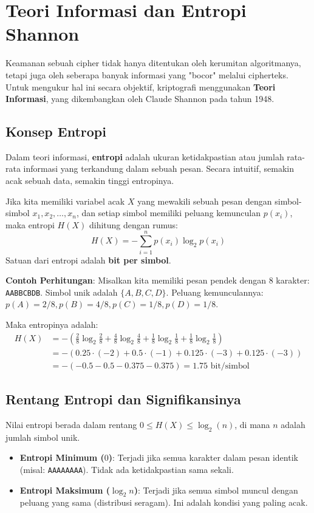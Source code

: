 \section{Teori Informasi dan Entropi Shannon}

Keamanan sebuah cipher tidak hanya ditentukan oleh kerumitan algoritmanya, tetapi juga oleh seberapa banyak informasi yang "bocor" melalui cipherteks. Untuk mengukur hal ini secara objektif, kriptografi menggunakan \textbf{Teori Informasi}, yang dikembangkan oleh Claude Shannon pada tahun 1948.

\subsection{Konsep Entropi}

Dalam teori informasi, \textbf{entropi} adalah ukuran ketidakpastian atau jumlah rata-rata informasi yang terkandung dalam sebuah pesan. Secara intuitif, semakin acak sebuah data, semakin tinggi entropinya.

Jika kita memiliki variabel acak $X$ yang mewakili sebuah pesan dengan simbol-simbol $x_1, x_2, \dots, x_n$, dan setiap simbol memiliki peluang kemunculan $p(x_i)$, maka entropi $H(X)$ dihitung dengan rumus:
\[ H(X) = - \sum_{i=1}^{n} p(x_i) \log_2 p(x_i) \]
Satuan dari entropi adalah \textbf{bit per simbol}.

\textbf{Contoh Perhitungan}:
Misalkan kita memiliki pesan pendek dengan 8 karakter: \texttt{AABBCBDB}.
Simbol unik adalah $\{A, B, C, D\}$. Peluang kemunculannya:
$p(A) = 2/8, p(B) = 4/8, p(C) = 1/8, p(D) = 1/8$.

Maka entropinya adalah:
\begin{align*}
    H(X) &= - \left( \frac{2}{8} \log_2 \frac{2}{8} + \frac{4}{8} \log_2 \frac{4}{8} + \frac{1}{8} \log_2 \frac{1}{8} + \frac{1}{8} \log_2 \frac{1}{8} \right) \\
    &= - \left( 0.25 \cdot (-2) + 0.5 \cdot (-1) + 0.125 \cdot (-3) + 0.125 \cdot (-3) \right) \\
    &= - (-0.5 - 0.5 - 0.375 - 0.375) = 1.75 \text{ bit/simbol}
\end{align*}

\subsection{Rentang Entropi dan Signifikansinya}

Nilai entropi berada dalam rentang $0 \le H(X) \le \log_2(n)$, di mana $n$ adalah jumlah simbol unik.
\begin{itemize}
    \item \textbf{Entropi Minimum ($0$)}: Terjadi jika semua karakter dalam pesan identik (misal: \texttt{AAAAAAAA}). Tidak ada ketidakpastian sama sekali.
    \item \textbf{Entropi Maksimum ($\log_2 n$)}: Terjadi jika semua simbol muncul dengan peluang yang sama (distribusi seragam). Ini adalah kondisi yang paling acak.
\end{itemize}

